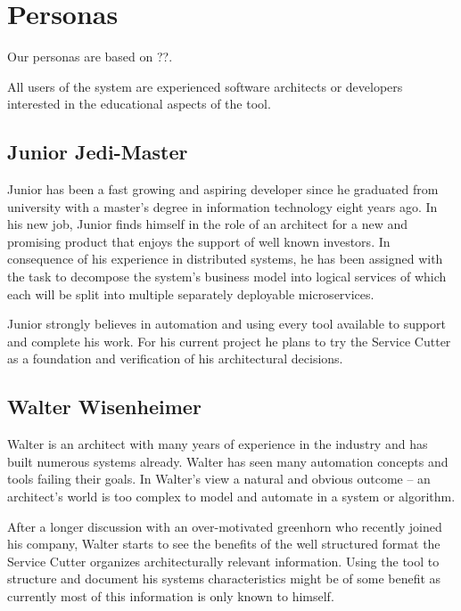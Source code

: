 
\section{Personas}

Our personas are based on ??. %

All users of the system are experienced software architects or developers interested in the educational aspects of the tool.



\subsection{Junior Jedi-Master}

Junior has been a fast growing and aspiring developer since he graduated from university with a master's degree in information technology eight years ago. In his new job, Junior finds himself in the role of an architect for a new and promising product that enjoys the support of well known investors. In consequence of his experience in distributed systems, he has been assigned with the task to decompose the system's business model into logical services of which each will be split into multiple separately deployable microservices. 

Junior strongly believes in automation and using every tool available to support and complete his work. For his current project he plans to try the Service Cutter as a foundation and verification of his architectural decisions. 


\subsection{Walter Wisenheimer}

Walter is an architect with many years of experience in the industry and has built numerous systems already. Walter has seen many automation concepts and tools failing their goals. In Walter's view a natural and obvious outcome -- an architect's world is too complex to model and automate in a system or algorithm. 

After a longer discussion with an over-motivated greenhorn who recently joined his company, Walter starts to see the benefits of the well structured format the Service Cutter organizes architecturally relevant information. Using the tool to structure and document his systems characteristics might be of some benefit as currently most of this information is only known to himself. 

